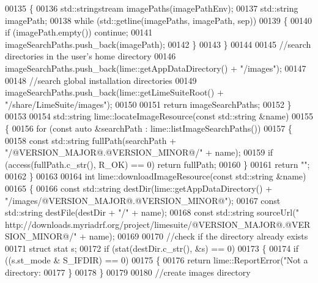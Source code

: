 \begin{DoxyCode}
00135     \{
00136         std::stringstream imagePaths(imagePathEnv);
00137         std::string imagePath;
00138         \textcolor{keywordflow}{while} (std::getline(imagePaths, imagePath, sep))
00139         \{
00140             \textcolor{keywordflow}{if} (imagePath.empty()) \textcolor{keywordflow}{continue};
00141             imageSearchPaths.push\_back(imagePath);
00142         \}
00143     \}
00144 
00145     \textcolor{comment}{//search directories in the user's home directory}
00146     imageSearchPaths.push\_back(lime::getAppDataDirectory() + \textcolor{stringliteral}{"/images"});
00147 
00148     \textcolor{comment}{//search global installation directories}
00149     imageSearchPaths.push\_back(lime::getLimeSuiteRoot() + \textcolor{stringliteral}{"/share/LimeSuite/images"});
00150 
00151     \textcolor{keywordflow}{return} imageSearchPaths;
00152 \}
00153 
00154 std::string lime::locateImageResource(\textcolor{keyword}{const} std::string &name)
00155 \{
00156     \textcolor{keywordflow}{for} (\textcolor{keyword}{const} \textcolor{keyword}{auto} &searchPath : lime::listImageSearchPaths())
00157     \{
00158         \textcolor{keyword}{const} std::string fullPath(searchPath + \textcolor{stringliteral}{"/@VERSION\_MAJOR@.@VERSION\_MINOR@/"} + name);
00159         \textcolor{keywordflow}{if} (access(fullPath.c\_str(), R\_OK) == 0) \textcolor{keywordflow}{return} fullPath;
00160     \}
00161     \textcolor{keywordflow}{return} \textcolor{stringliteral}{""};
00162 \}
00163 
00164 \textcolor{keywordtype}{int} lime::downloadImageResource(\textcolor{keyword}{const} std::string &name)
00165 \{
00166     \textcolor{keyword}{const} std::string destDir(lime::getAppDataDirectory() + \textcolor{stringliteral}{"/images/@VERSION\_MAJOR@.@VERSION\_MINOR@"});
00167     \textcolor{keyword}{const} std::string destFile(destDir + \textcolor{stringliteral}{"/"} + name);
00168     \textcolor{keyword}{const} std::string sourceUrl(\textcolor{stringliteral}{"
      http://downloads.myriadrf.org/project/limesuite/@VERSION\_MAJOR@.@VERSION\_MINOR@/"} + name);
00169 
00170     \textcolor{comment}{//check if the directory already exists}
00171     \textcolor{keyword}{struct }stat s;
00172     \textcolor{keywordflow}{if} (stat(destDir.c\_str(), &s) == 0)
00173     \{
00174         \textcolor{keywordflow}{if} ((s.st\_mode & S\_IFDIR) == 0)
00175         \{
00176             \textcolor{keywordflow}{return} lime::ReportError(\textcolor{stringliteral}{"Not a directory: %
00177         \}
00178     \}
00179 
00180     \textcolor{comment}{//create images directory}
}
\end{DoxyCode}
